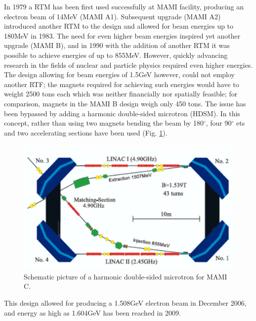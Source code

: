 In 1979 a RTM has been first used successfully at MAMI facility, producing an electron beam of 14MeV (MAMI A1). Subsequent upgrade (MAMI A2) introduced another RTM to the design and allowed for beam energies up to 180MeV in 1983. The need for even higher beam energies inspired yet another upgrade (MAMI B), and in 1990 with the addition of another RTM it was possible to achieve energies of up to 855MeV. However, quickly advancing research in the fields of nuclear and particle physics required even higher energies. The design allowing for beam energies of 1.5GeV however, could not employ another RTF; the magnets required for achieving such energies would have to weight 2500 tons each which was neither financially nor spatially feasible; for comparison, magnets in the MAMI B design weigh only 450 tons. The issue has been bypassed by adding a harmonic double-sided microtron (HDSM). In this concept, rather than using two magnets bending the beam by 180$^{\circ}$, four 90$^{\circ}$ ets and two accelerating sections have been used (Fig. \ref{mamic}). 

\begin{figure}[H]
\begin{center}
\includegraphics[scale=0.25]{HDSM.png}
\caption{Schematic picture of a harmonic double-sided microtron for MAMI C.}
\label{mamic}
\end{center}
\end{figure}

This design allowed for producing a 1.508GeV electron beam in December 2006, and energy as high as 1.604GeV has been reached in 2009.

